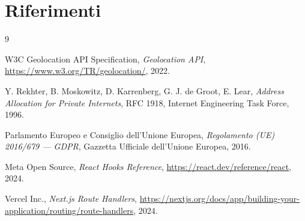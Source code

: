 \documentclass[12pt, a4paper]{article}
\begin{document}
\section*{Riferimenti}
\begin{thebibliography}{9}

  W3C Geolocation API Specification, \textit{Geolocation API},
  \url{https://www.w3.org/TR/geolocation/}, 2022.

  Y. Rekhter, B. Moskowitz, D. Karrenberg, G. J. de Groot, E. Lear,
  \textit{Address Allocation for Private Internets}, RFC 1918,
  Internet Engineering Task Force, 1996.

  Parlamento Europeo e Consiglio dell'Unione Europea,
  \textit{Regolamento (UE) 2016/679 — GDPR},
  Gazzetta Ufficiale dell'Unione Europea, 2016.

  Meta Open Source, \textit{React Hooks Reference},
  \url{https://react.dev/reference/react}, 2024.

  Vercel Inc., \textit{Next.js Route Handlers},
  \url{https://nextjs.org/docs/app/building-your-application/routing/route-handlers}, 2024.

\end{thebibliography}
\end{document}
